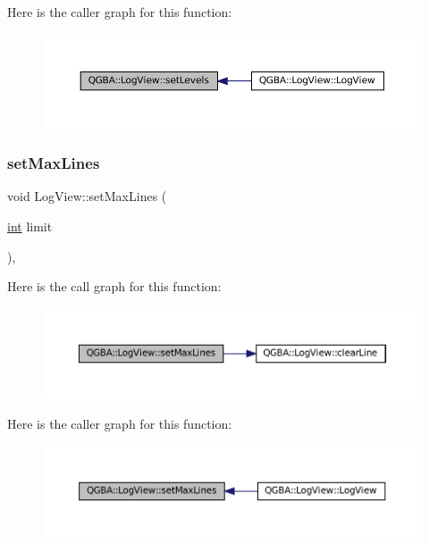 Here is the caller graph for this function\+:
\nopagebreak
\begin{figure}[H]
\begin{center}
\leavevmode
\includegraphics[width=350pt]{class_q_g_b_a_1_1_log_view_a813aa9ea6e209b95f0b467610b528e08_icgraph}
\end{center}
\end{figure}
\mbox{\label{class_q_g_b_a_1_1_log_view_a237ab0cd2c41fe85a3a8b254fb029c44}} 
\subsubsection{\texorpdfstring{set\+Max\+Lines}{setMaxLines}}
{\footnotesize\ttfamily void Log\+View\+::set\+Max\+Lines (\begin{DoxyParamCaption}\item[{\mbox{\hyperlink{ioapi_8h_a787fa3cf048117ba7123753c1e74fcd6}{int}}}]{limit }\end{DoxyParamCaption})\hspace{0.3cm}{\ttfamily [private]}, {\ttfamily [slot]}}

Here is the call graph for this function\+:
\nopagebreak
\begin{figure}[H]
\begin{center}
\leavevmode
\includegraphics[width=350pt]{class_q_g_b_a_1_1_log_view_a237ab0cd2c41fe85a3a8b254fb029c44_cgraph}
\end{center}
\end{figure}
Here is the caller graph for this function\+:
\nopagebreak
\begin{figure}[H]
\begin{center}
\leavevmode
\includegraphics[width=350pt]{class_q_g_b_a_1_1_log_view_a237ab0cd2c41fe85a3a8b254fb029c44_icgraph}
\end{center}
\end{figure}


